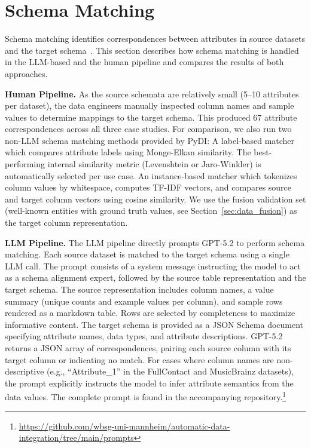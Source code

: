 \section{Schema Matching}
\label{sec:schema_matching}

Schema matching identifies correspondences between attributes in source datasets and the target schema~\cite{rahm2001survey, zhang2023schema}. This section describes how schema matching is handled in the LLM-based and the human pipeline and compares the results of both approaches.

\textbf{Human Pipeline.} As the source schemata are relatively small (5--10 attributes per dataset), the data engineers manually inspected column names and sample values to determine mappings to the target schema. This produced 67 attribute correspondences across all three case studies. For comparison, we also run two non-LLM schema matching methods provided by PyDI: A label-based matcher which compares attribute labels using Monge-Elkan similarity. The best-performing internal similarity metric (Levenshtein or Jaro-Winkler) is automatically selected per use case. An instance-based matcher which tokenizes column values by whitespace, computes TF-IDF vectors, and compares source and target column vectors using cosine similarity. We use the fusion validation set (well-known entities with ground truth values, see Section~\ref{sec:data_fusion}) as the target column representation.

\textbf{LLM Pipeline.} \label{sec:sm_approach}
The LLM pipeline directly prompts GPT-5.2 to perform schema matching. Each source dataset is matched to the target schema using a single LLM call. The prompt consists of a system message instructing the model to act as a schema alignment expert, followed by the source table representation and the target schema. The source representation includes column names, a value summary (unique counts and example values per column), and sample rows rendered as a markdown table. Rows are selected by completeness to maximize informative content. The target schema is provided as a JSON Schema document specifying attribute names, data types, and attribute descriptions. GPT-5.2 returns a JSON array of correspondences, pairing each source column with its target column or indicating no match. For cases where column names are non-descriptive (e.g., ``Attribute\_1'' in the FullContact and MusicBrainz datasets), the prompt explicitly instructs the model to infer attribute semantics from the data values.
The complete prompt is found in the accompanying repository.\footnote{\url{https://github.com/wbsg-uni-mannheim/automatic-data-integration/tree/main/prompts}\label{fn:prompts}}

